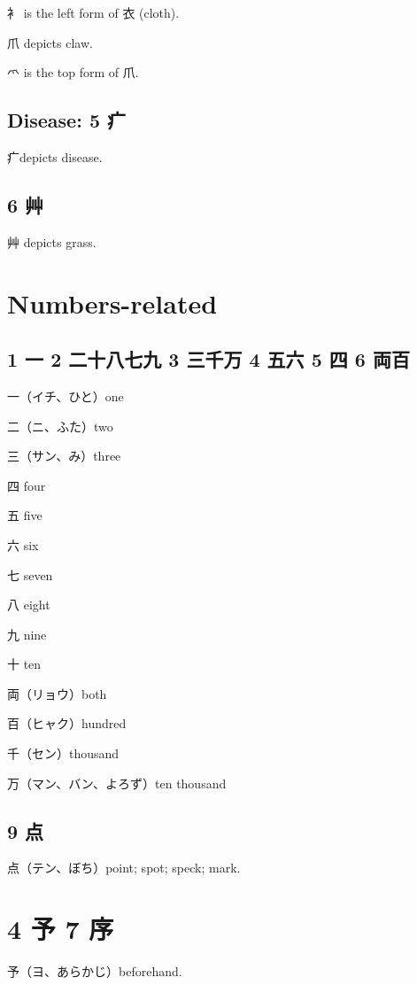 衤 is the left form of 衣 (cloth).

爪 depicts claw.

爫 is the top form of 爪.

\subsection{Disease: 5 疒}

疒depicts disease.

\subsection{6 艸}

艸 depicts grass.

\section{Numbers-related}

\subsection{1 一 2 二十八七九 3 三千万 4 五六 5 四 6 両百}

一（イチ、ひと）one

二（ニ、ふた）two

三（サン、み）three

四 four

五 five

六 six

七 seven

八 eight

九 nine

十 ten

両（リョウ）both

百（ヒャク）hundred

千（セン）thousand

万（マン、バン、よろず）ten thousand

\subsection{9 点}

点（テン、ぼち）point; spot; speck; mark.

\section{4 予 7 序}

予（ヨ、あらかじ）beforehand.


